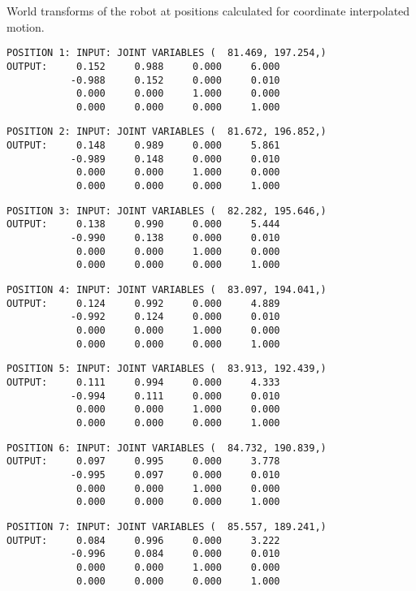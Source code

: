 \newpage
World transforms of the robot at positions calculated for coordinate interpolated motion.
\begin{verbatim}
POSITION 1: INPUT: JOINT VARIABLES (  81.469, 197.254,)
OUTPUT:     0.152     0.988     0.000     6.000
           -0.988     0.152     0.000     0.010
            0.000     0.000     1.000     0.000
            0.000     0.000     0.000     1.000
\end{verbatim} \pagebreak[1]\begin{verbatim}
POSITION 2: INPUT: JOINT VARIABLES (  81.672, 196.852,)
OUTPUT:     0.148     0.989     0.000     5.861
           -0.989     0.148     0.000     0.010
            0.000     0.000     1.000     0.000
            0.000     0.000     0.000     1.000
\end{verbatim} \pagebreak[1]\begin{verbatim}
POSITION 3: INPUT: JOINT VARIABLES (  82.282, 195.646,)
OUTPUT:     0.138     0.990     0.000     5.444
           -0.990     0.138     0.000     0.010
            0.000     0.000     1.000     0.000
            0.000     0.000     0.000     1.000
\end{verbatim} \pagebreak[1]\begin{verbatim}
POSITION 4: INPUT: JOINT VARIABLES (  83.097, 194.041,)
OUTPUT:     0.124     0.992     0.000     4.889
           -0.992     0.124     0.000     0.010
            0.000     0.000     1.000     0.000
            0.000     0.000     0.000     1.000
\end{verbatim} \pagebreak[1]\begin{verbatim}
POSITION 5: INPUT: JOINT VARIABLES (  83.913, 192.439,)
OUTPUT:     0.111     0.994     0.000     4.333
           -0.994     0.111     0.000     0.010
            0.000     0.000     1.000     0.000
            0.000     0.000     0.000     1.000
\end{verbatim} \pagebreak[1]\begin{verbatim}
POSITION 6: INPUT: JOINT VARIABLES (  84.732, 190.839,)
OUTPUT:     0.097     0.995     0.000     3.778
           -0.995     0.097     0.000     0.010
            0.000     0.000     1.000     0.000
            0.000     0.000     0.000     1.000
\end{verbatim} \pagebreak[1]\begin{verbatim}
POSITION 7: INPUT: JOINT VARIABLES (  85.557, 189.241,)
OUTPUT:     0.084     0.996     0.000     3.222
           -0.996     0.084     0.000     0.010
            0.000     0.000     1.000     0.000
            0.000     0.000     0.000     1.000

\end{verbatim}

